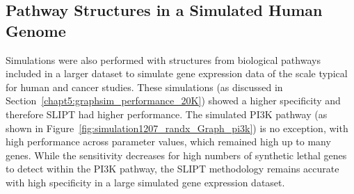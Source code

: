 \FloatBarrier

\subsection{Pathway Structures in a Simulated Human Genome}

\FloatBarrier

Simulations were also performed with  structures from biological pathways included in a larger dataset to simulate \gls{gene expression} data of the scale typical for human and cancer studies. These simulations (as discussed in Section~\ref{chapt5:graphsim_performance_20K}) showed a higher specificity and therefore \gls{SLIPT} had higher performance. The simulated \gls{PI3K} pathway (as shown in Figure~\ref{fig:simulation1207_randx_Graph_pi3k}) is no exception, with high performance across parameter values, which remained high up to many genes. While the sensitivity decreases for high numbers of \gls{synthetic lethal} genes to detect within the \gls{PI3K} pathway, the \gls{SLIPT} methodology remains accurate with high specificity in a large simulated \gls{gene expression} dataset. 

